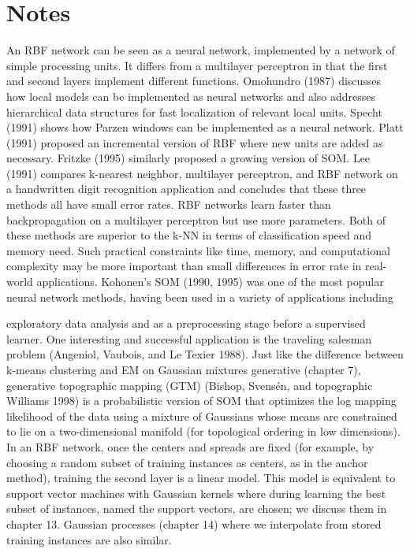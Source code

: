 \section{Notes}

An RBF network can be seen as a neural network, implemented by a network of simple processing units. It differs from a multilayer perceptron in that the first and second layers implement different functions. Omohundro (1987) discusses how local models can be implemented as neural networks and also addresses hierarchical data structures for fast localization of relevant local units. Specht (1991) shows how Parzen windows can be implemented as a neural network. Platt (1991) proposed an incremental version of RBF where new units are added as necessary. Fritzke (1995) similarly proposed a growing version of SOM. Lee (1991) compares k-nearest neighbor, multilayer perceptron, and RBF network on a handwritten digit recognition application and concludes that these three methods all have small error rates. RBF networks learn faster than backpropagation on a multilayer perceptron but use more parameters. Both of these methods are superior to the k-NN in terms of classification speed and memory need. Such practical constraints like time, memory, and computational complexity may be more important than small differences in error rate in real-world applications. Kohonen’s SOM (1990, 1995) was one of the most popular neural network methods, having been used in a variety of applications including

exploratory data analysis and as a preprocessing stage before a supervised learner. One interesting and successful application is the traveling salesman problem (Angeniol, Vaubois, and Le Texier 1988). Just like the difference between k-means clustering and EM on Gaussian mixtures generative (chapter 7), generative topographic mapping (GTM) (Bishop, Svensén, and topographic Williams 1998) is a probabilistic version of SOM that optimizes the log mapping likelihood of the data using a mixture of Gaussians whose means are constrained to lie on a two-dimensional manifold (for topological ordering in low dimensions). In an RBF network, once the centers and spreads are fixed (for example, by choosing a random subset of training instances as centers, as in the anchor method), training the second layer is a linear model. This model is equivalent to support vector machines with Gaussian kernels where during learning the best subset of instances, named the support vectors, are chosen; we discuss them in chapter 13. Gaussian processes (chapter 14) where we interpolate from stored training instances are also similar.

